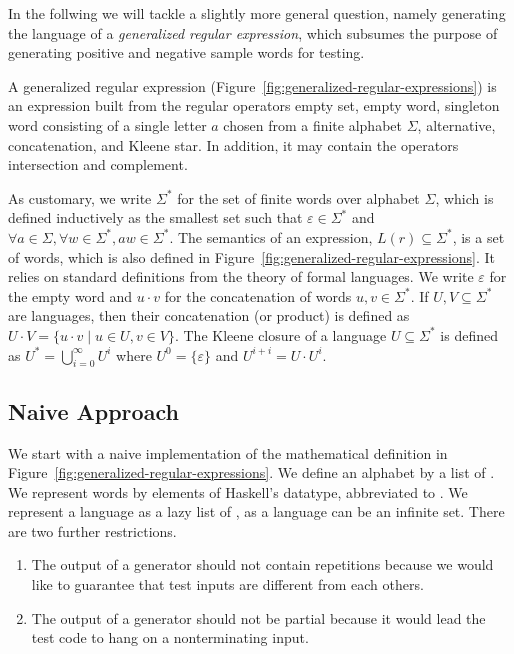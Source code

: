 In the follwing we will tackle a slightly more general question, namely generating
the language of a \emph{generalized regular expression}, 
which subsumes the purpose of generating positive and negative sample
words for testing.

A generalized regular expression
(Figure~\ref{fig:generalized-regular-expressions}) is an expression
built from the regular operators empty set, empty word, singleton word
consisting of a single letter $a$ chosen from a finite alphabet
$\Sigma$, alternative, concatenation, and Kleene star. In addition, it
may contain the operators intersection and complement.

As customary, we write $\Sigma^*$ for the set of finite words over
alphabet $\Sigma$, which is defined inductively as the smallest set
such that $\varepsilon \in
\Sigma^*$ and $\forall a\in\Sigma, \forall w\in\Sigma^*, aw \in \Sigma^*$.
The semantics of an expression, $L(r) \subseteq \Sigma^*$, is a set of
words, which is also defined in
Figure~\ref{fig:generalized-regular-expressions}. It relies on
standard definitions from the theory of formal languages. We write
$\varepsilon$ for the empty word and $u\cdot v$ for the concatenation
of words $u, v \in \Sigma^*$. If $U, V \subseteq \Sigma^*$ are
languages, then their concatenation (or product) is defined as $U\cdot
V = \{ u\cdot v \mid u\in U, v\in V\}$. The Kleene closure of a
language $U\subseteq \Sigma^*$ is defined as $U^* =
\bigcup_{i=0}^\infty U^i$ where $U^0 = \{\varepsilon\}$ and $U^{i+i} =
U \cdot U^i$. 

\subsection{Naive Approach}
\label{sec:naive-approach}

We start with a naive implementation of the mathematical definition in
Figure~\ref{fig:generalized-regular-expressions}. We define an
alphabet by a list of .  We represent words by elements of Haskell's
 datatype, abbreviated to . We
represent a language as a lazy list of , as a language
can be an infinite set. There are two further restrictions.
\begin{enumerate}
\item The output of a generator should not contain repetitions
  because we would like to guarantee that test inputs are different
  from each others.
\item The output of a generator should not be partial because it would
  lead the test code to hang on a nonterminating input.
\end{enumerate}

